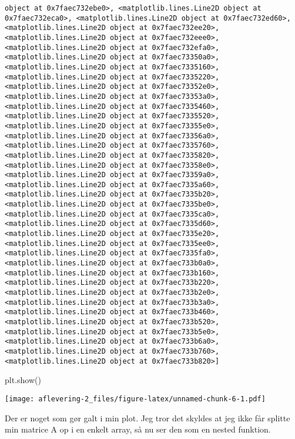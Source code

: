\documentclass[
]{article}
\newenvironment{Shaded}{\begin{snugshade}}{\end{snugshade}}
\newcommand{\NormalTok}[1]{#1}
\begin{document}
\begin{verbatim}
object at 0x7faec732ebe0>, <matplotlib.lines.Line2D object at 0x7faec732eca0>, <matplotlib.lines.Line2D object at 0x7faec732ed60>, <matplotlib.lines.Line2D object at 0x7faec732ee20>, <matplotlib.lines.Line2D object at 0x7faec732eee0>, <matplotlib.lines.Line2D object at 0x7faec732efa0>, <matplotlib.lines.Line2D object at 0x7faec73350a0>, <matplotlib.lines.Line2D object at 0x7faec7335160>, <matplotlib.lines.Line2D object at 0x7faec7335220>, <matplotlib.lines.Line2D object at 0x7faec73352e0>, <matplotlib.lines.Line2D object at 0x7faec73353a0>, <matplotlib.lines.Line2D object at 0x7faec7335460>, <matplotlib.lines.Line2D object at 0x7faec7335520>, <matplotlib.lines.Line2D object at 0x7faec73355e0>, <matplotlib.lines.Line2D object at 0x7faec73356a0>, <matplotlib.lines.Line2D object at 0x7faec7335760>, <matplotlib.lines.Line2D object at 0x7faec7335820>, <matplotlib.lines.Line2D object at 0x7faec73358e0>, <matplotlib.lines.Line2D object at 0x7faec73359a0>, <matplotlib.lines.Line2D object at 0x7faec7335a60>, <matplotlib.lines.Line2D object at 0x7faec7335b20>, <matplotlib.lines.Line2D object at 0x7faec7335be0>, <matplotlib.lines.Line2D object at 0x7faec7335ca0>, <matplotlib.lines.Line2D object at 0x7faec7335d60>, <matplotlib.lines.Line2D object at 0x7faec7335e20>, <matplotlib.lines.Line2D object at 0x7faec7335ee0>, <matplotlib.lines.Line2D object at 0x7faec7335fa0>, <matplotlib.lines.Line2D object at 0x7faec733b0a0>, <matplotlib.lines.Line2D object at 0x7faec733b160>, <matplotlib.lines.Line2D object at 0x7faec733b220>, <matplotlib.lines.Line2D object at 0x7faec733b2e0>, <matplotlib.lines.Line2D object at 0x7faec733b3a0>, <matplotlib.lines.Line2D object at 0x7faec733b460>, <matplotlib.lines.Line2D object at 0x7faec733b520>, <matplotlib.lines.Line2D object at 0x7faec733b5e0>, <matplotlib.lines.Line2D object at 0x7faec733b6a0>, <matplotlib.lines.Line2D object at 0x7faec733b760>, <matplotlib.lines.Line2D object at 0x7faec733b820>]
\end{verbatim}

\begin{Shaded}
\begin{Highlighting}[]
\NormalTok{plt.show()}
\end{Highlighting}
\end{Shaded}

\texttt{[image: aflevering-2\_files/figure-latex/unnamed-chunk-6-1.pdf]}

Der er noget som gør galt i min plot. Jeg tror det skyldes at jeg ikke
får splitte min matrice A op i en enkelt array, så nu ser den som en
nested funktion.
\end{document}
